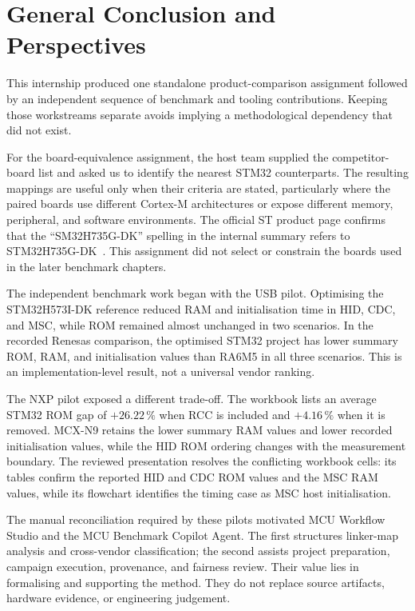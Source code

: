\chapter*{General Conclusion and Perspectives}
{}
\label{chap:cascade-general-conclusion}

This internship produced one standalone product-comparison assignment followed by an
independent sequence of benchmark and tooling contributions. Keeping those workstreams
separate avoids implying a methodological dependency that did not exist.

For the board-equivalence assignment, the host team supplied the competitor-board list and
asked us to identify the nearest STM32 counterparts. The resulting mappings are useful only
when their criteria are stated, particularly where
the paired boards use different Cortex-M architectures or expose different memory,
peripheral, and software environments. The official ST product page confirms that the
``SM32H735G-DK'' spelling in the internal summary refers to
STM32H735G-DK~\cite{st-stm32h735g-dk}. This assignment did not
select or constrain the boards used in the later benchmark chapters.

The independent benchmark work began with the USB pilot. Optimising the STM32H573I-DK reference
reduced RAM and initialisation time in HID, CDC, and MSC, while ROM remained almost
unchanged in two scenarios. In the recorded Renesas comparison, the optimised STM32 project
has lower summary ROM, RAM, and initialisation values than RA6M5 in all three scenarios.
This is an implementation-level result, not a universal vendor ranking.

The NXP pilot exposed a different trade-off. The workbook lists an average STM32 ROM gap
of $+26.22\,\%$ when RCC is included and $+4.16\,\%$ when it is removed. MCX-N9 retains
the lower summary RAM values and lower recorded initialisation values, while the HID ROM
ordering changes with the measurement boundary. The reviewed presentation resolves the
conflicting workbook cells: its tables confirm the reported HID and CDC ROM values and the
MSC RAM values, while its flowchart identifies the timing case as MSC host initialisation.

The manual reconciliation required by these pilots motivated MCU Workflow Studio and the
MCU Benchmark Copilot Agent. The first structures linker-map analysis and cross-vendor
classification; the second assists project preparation, campaign execution, provenance,
and fairness review. Their value lies in formalising and supporting the method. They do not
replace source artifacts, hardware evidence, or engineering judgement.

